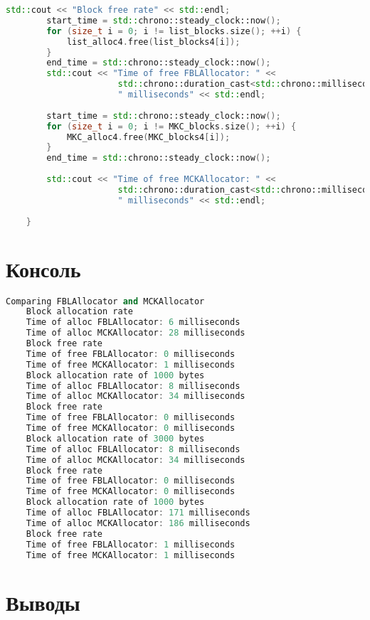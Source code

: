 \documentclass[a4paper, 12pt]{article}
\begin{document}
\begin{lstlisting}[language=C++]
        std::cout << "Block free rate" << std::endl;
        start_time = std::chrono::steady_clock::now();
        for (size_t i = 0; i != list_blocks.size(); ++i) {
            list_alloc4.free(list_blocks4[i]);
        }
        end_time = std::chrono::steady_clock::now();
        std::cout << "Time of free FBLAllocator: " << 
                      std::chrono::duration_cast<std::chrono::milliseconds>(end_time - start_time).count() << 
                      " milliseconds" << std::endl;
    
        start_time = std::chrono::steady_clock::now();
        for (size_t i = 0; i != MKC_blocks.size(); ++i) {
            MKC_alloc4.free(MKC_blocks4[i]);
        }
        end_time = std::chrono::steady_clock::now();
    
        std::cout << "Time of free MCKAllocator: " << 
                      std::chrono::duration_cast<std::chrono::milliseconds>(end_time - start_time).count() << 
                      " milliseconds" << std::endl;
    
    }
\end{lstlisting}

\newpage
\section{Консоль}
\begin{lstlisting}[language=C++]
    Comparing FBLAllocator and MCKAllocator
    Block allocation rate
    Time of alloc FBLAllocator: 6 milliseconds
    Time of alloc MCKAllocator: 28 milliseconds
    Block free rate
    Time of free FBLAllocator: 0 milliseconds
    Time of free MCKAllocator: 1 milliseconds
    Block allocation rate of 1000 bytes
    Time of alloc FBLAllocator: 8 milliseconds
    Time of alloc MCKAllocator: 34 milliseconds
    Block free rate
    Time of free FBLAllocator: 0 milliseconds
    Time of free MCKAllocator: 0 milliseconds
    Block allocation rate of 3000 bytes
    Time of alloc FBLAllocator: 8 milliseconds
    Time of alloc MCKAllocator: 34 milliseconds
    Block free rate
    Time of free FBLAllocator: 0 milliseconds
    Time of free MCKAllocator: 0 milliseconds
    Block allocation rate of 1000 bytes
    Time of alloc FBLAllocator: 171 milliseconds
    Time of alloc MCKAllocator: 186 milliseconds
    Block free rate
    Time of free FBLAllocator: 1 milliseconds
    Time of free MCKAllocator: 1 milliseconds
\end{lstlisting}

\newpage
\section{Выводы}
\end{document}
